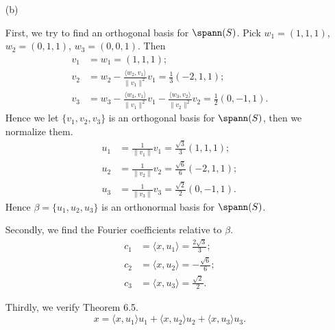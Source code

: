 \begin{Exercise}
\begin{enumerate}[(a)]
\item[(b)]
\begin{solution}
First, we try to find an orthogonal basis for $\spann(S)$. Pick $w_1 = (1,1,1)$, $w_2 = (0,1,1)$, $w_3 = (0,0,1)$. Then 
\begin{align*}
v_1 &= w_1 = (1,1,1); \\
v_2 &= w_2 - \frac{\langle w_2, v_1 \rangle}{\|v_1\|^2}v_1
= \frac{1}{3}(-2,1,1); \\
v_3 &= w_3 - \frac{\langle w_3,v_1 \rangle}{\|v_1\|^2}v_1 - \frac{\langle w_3, v_2 \rangle}{\|v_2\|^2}v_2
= \frac{1}{2}(0,-1,1).
\end{align*}
Hence we let $\{v_1, v_2, v_3\}$ is an orthogonal basis for $\spann(S)$, then we normalize them.
\begin{align*}
u_1 &= \frac{1}{\|v_1\|}v_1 = \frac{\sqrt{3}}{3}(1,1,1); \\
u_2 &= \frac{1}{\|v_2\|}v_2 = \frac{\sqrt{6}}{6}(-2,1,1); \\
u_3 &= \frac{1}{\|v_3\|}v_3 = \frac{\sqrt{2}}{2}(0,-1,1).
\end{align*}
Hence $\beta = \{u_1,u_2,u_3\}$ is an orthonormal basis for $\spann(S)$.

Secondly, we find the Fourier coefficients relative to $\beta$.
\begin{align*}
c_1 &= \langle x, u_1 \rangle = \frac{2\sqrt{3}}{3}; \\
c_2 &= \langle x, u_2 \rangle = -\frac{\sqrt{6}}{6}; \\
c_3 &= \langle x, u_3 \rangle = \frac{\sqrt{2}}{2}.
\end{align*}

Thirdly, we verify Theorem 6.5.
$$
x = \langle x, u_1 \rangle u_1 + \langle x,u_2 \rangle u_2 + \langle x, u_3 \rangle u_3.
$$
\end{solution}
\end{enumerate}
\end{Exercise}